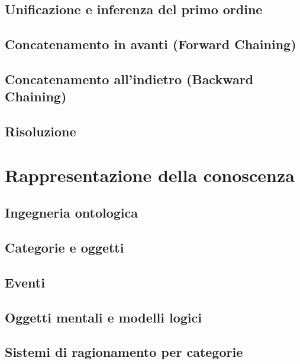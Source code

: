 \documentclass[a4paper]{extarticle}
\begin{document}
\subsection{Unificazione e inferenza del primo ordine}

\subsection{Concatenamento in avanti (Forward Chaining)}

\subsection{Concatenamento all'indietro (Backward Chaining)}

\subsection{Risoluzione}

\newpage

\section{Rappresentazione della conoscenza}

\subsection{Ingegneria ontologica}

\subsection{Categorie e oggetti}

\subsection{Eventi}

\subsection{Oggetti mentali e modelli logici}

\subsection{Sistemi di ragionamento per categorie}
\end{document}
